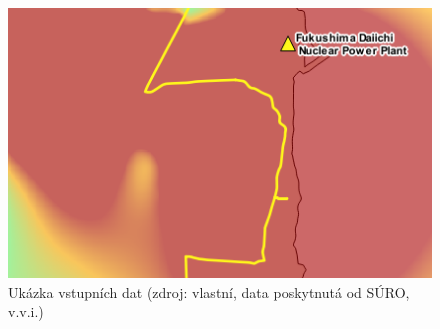 \begin{figure}[H] \centering
    \includegraphics[scale=0.6]{./pictures/ukazka_vstupnich_dat.png}
    \caption[Ukázka vstupních dat]{Ukázka vstupních dat (zdroj:
vlastní, data poskytnutá od SÚRO, v.v.i.)}
    \label{fig:vstup}
\end{figure}
  			
